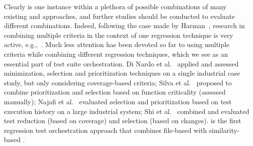 
Clearly \fz is one instance within a plethora of possible combinations of many existing \tcs and \tcp approaches, and further studies should be conducted to evaluate  different combinations.
Indeed, following the case made by Harman~\cite{harman2011making},
research in combining multiple criteria in the context of one regression technique is very active, e.g.,~\cite{epitropakis2015empirical,garousi2018multi}.
Much less attention has been devoted so far to using multiple criteria while combining different regression techniques, which we see as an essential part of test suite orchestration.
Di Nardo et al.~\cite{di2015coverage} applied and assessed minimization, selection and prioritization techniques on a single industrial case study, but only considering coverage-based criteria;  Silva et al.~\cite{silva2016hybrid} proposed to combine prioritization and selection based on function criticality (assessed manually); Najafi et al.~\cite{najafi2019improving} evaluated selection and prioritization based on test execution history on a large industrial system;
Shi et al.~\cite{shi2015comparing} combined and evaluated test reduction (based on coverage) and selection (based on changes). 
\fz is the first regression test orchestration approach that combines file-based \tcs with similarity-based \tcp.

